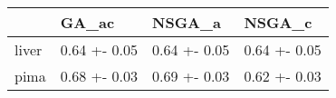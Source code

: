 \begin{tabular}{llll}
\toprule
{} &         GA\_ac &        NSGA\_a &        NSGA\_c \\
\midrule
liver &  0.64 +- 0.05 &  0.64 +- 0.05 &  0.64 +- 0.05 \\
pima  &  0.68 +- 0.03 &  0.69 +- 0.03 &  0.62 +- 0.03 \\
\bottomrule
\end{tabular}
